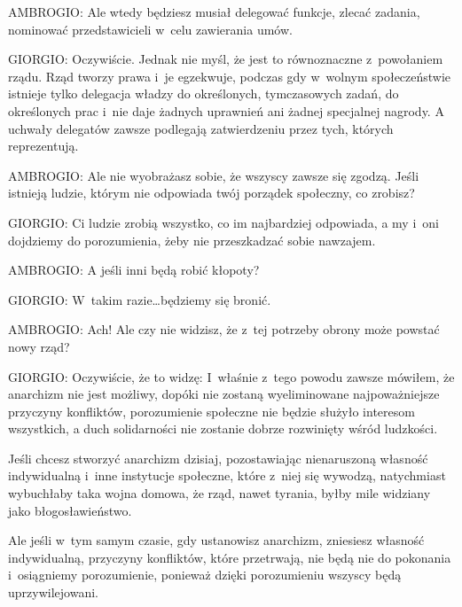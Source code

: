 \documentclass[oneside,polish,11pt,sfheadings]{mwbk}
\begin{document}
 
\noindent AMBROGIO: Ale wtedy będziesz musiał delegować funkcje, zlecać zadania, nominować przedstawicieli w~celu zawierania
umów. 




 
\noindent GIORGIO: Oczywiście. Jednak nie myśl, że jest to równoznaczne z~powołaniem rządu. Rząd tworzy prawa i~je egzekwuje,
podczas gdy w~wolnym społeczeństwie istnieje tylko delegacja władzy do określonych, tymczasowych zadań, do określonych
prac i~nie daje żadnych uprawnień ani żadnej specjalnej nagrody. A uchwały delegatów zawsze podlegają zatwierdzeniu
przez tych, których reprezentują. 




 
\noindent AMBROGIO: Ale nie wyobrażasz sobie, że wszyscy zawsze się zgodzą. Jeśli istnieją ludzie, którym nie odpowiada twój
porządek społeczny, co zrobisz? 




 
\noindent GIORGIO: Ci ludzie zrobią wszystko, co im najbardziej odpowiada, a my i~oni dojdziemy do porozumienia, żeby nie
przeszkadzać sobie nawzajem. 




 
\noindent AMBROGIO: A jeśli inni będą robić kłopoty? 




 
\noindent GIORGIO: W~takim razie\ldots będziemy się bronić. 




 
\noindent AMBROGIO: Ach! Ale czy nie widzisz, że z~tej potrzeby obrony może powstać nowy rząd? 




 
\noindent GIORGIO: Oczywiście, że to widzę: I~właśnie z~tego powodu zawsze mówiłem, że anarchizm nie jest możliwy, dopóki nie
zostaną wyeliminowane najpoważniejsze przyczyny konfliktów, porozumienie społeczne nie będzie służyło interesom
wszystkich, a duch solidarności nie zostanie dobrze rozwinięty wśród ludzkości. 

 
Jeśli chcesz stworzyć anarchizm dzisiaj, pozostawiając nienaruszoną własność indywidualną i~inne instytucje społeczne,
które z~niej się wywodzą, natychmiast wybuchłaby taka wojna domowa, że rząd, nawet tyrania, byłby mile widziany jako
błogosławieństwo. 

 
Ale jeśli w~tym samym czasie, gdy ustanowisz anarchizm, zniesiesz własność indywidualną, przyczyny konfliktów, które
przetrwają, nie będą nie do pokonania i~osiągniemy porozumienie, ponieważ dzięki porozumieniu wszyscy będą
uprzywilejowani. 
\end{document}

